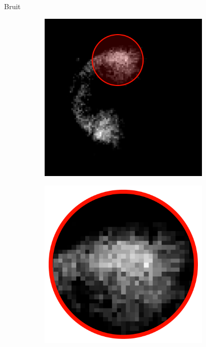 \documentclass[10pt]{beamer}
\begin{document}
\begin{frame}{Bruit}
\begin{figure}[ht]
\begin{subfigure}[t]{0.33\textwidth}
      \includegraphics[width=0.9\textwidth]{fig/nmf_components_2_closeup}
      \caption{}
      \label{subfig:cluster2}
    \end{subfigure}%
     \begin{subfigure}[t]{0.33\textwidth}
      \centering
      \includegraphics[width=0.90\textwidth]{fig/nmf_components_2_closeup2}
      \caption{}
      \label{subfig:cluster1}
    \end{subfigure}%
  \end{figure}

\end{frame}
\end{document}

